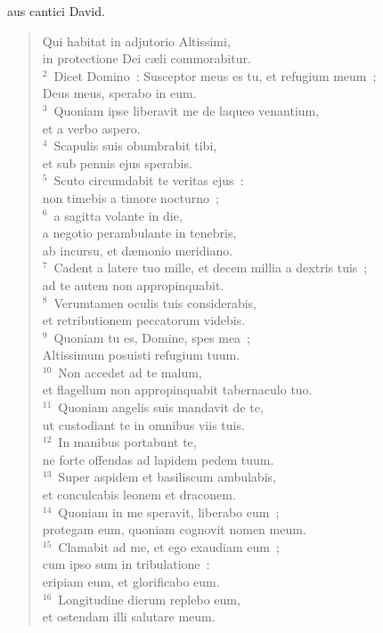 \bchapter
{}aus cantici David. \begin{flushleft}\begin{verse}\vspace{6pt}Qui habitat in adjutorio Altissimi,\\ in protectione Dei c\ae li commorabitur.\\
${}^{2}$~Dicet Domino~: Susceptor meus es tu, et refugium meum~;\\ Deus meus, sperabo in eum.\\
${}^{3}$~Quoniam ipse liberavit me de laqueo venantium,\\ et a verbo aspero.\\
${}^{4}$~Scapulis suis obumbrabit tibi,\\ et sub pennis ejus sperabis.\\
${}^{5}$~Scuto circumdabit te veritas ejus~:\\ non timebis a timore nocturno~;\\
${}^{6}$~a sagitta volante in die,\\ a negotio perambulante in tenebris,\\ ab incursu, et d\ae monio meridiano.\\
${}^{7}$~Cadent a latere tuo mille, et decem millia a dextris tuis~;\\ ad te autem non appropinquabit.\\
${}^{8}$~Verumtamen oculis tuis considerabis,\\ et retributionem peccatorum videbis.\\
${}^{9}$~Quoniam tu es, Domine, spes mea~;\\ Altissimum posuisti refugium tuum.\\
${}^{10}$~Non accedet ad te malum,\\ et flagellum non appropinquabit tabernaculo tuo.\\
${}^{11}$~Quoniam angelis suis mandavit de te,\\ ut custodiant te in omnibus viis tuis.\\
${}^{12}$~In manibus portabunt te,\\ ne forte offendas ad lapidem pedem tuum.\\
${}^{13}$~Super aspidem et basiliscum ambulabis,\\ et conculcabis leonem et draconem.\\
${}^{14}$~Quoniam in me speravit, liberabo eum~;\\ protegam eum, quoniam cognovit nomen meum.\\
${}^{15}$~Clamabit ad me, et ego exaudiam eum~;\\ cum ipso sum in tribulatione~:\\ eripiam eum, et glorificabo eum.\\
${}^{16}$~Longitudine dierum replebo eum,\\ et ostendam illi salutare meum.\end{verse}\end{flushleft}



